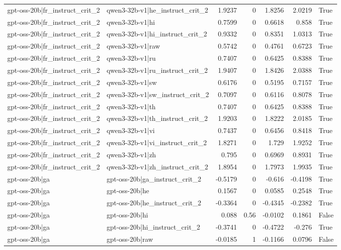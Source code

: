 \begin{table}
\begin{tabular}{l l r r r r l}
gpt-oss-20b|fr_instruct_crit_2 & qwen3-32b-v1|he_instruct_crit_2 & 1.9237 & 0 & 1.8256 & 2.0219 & True \\
gpt-oss-20b|fr_instruct_crit_2 & qwen3-32b-v1|hi & 0.7599 & 0 & 0.6618 & 0.858 & True \\
gpt-oss-20b|fr_instruct_crit_2 & qwen3-32b-v1|hi_instruct_crit_2 & 0.9332 & 0 & 0.8351 & 1.0313 & True \\
gpt-oss-20b|fr_instruct_crit_2 & qwen3-32b-v1|raw & 0.5742 & 0 & 0.4761 & 0.6723 & True \\
gpt-oss-20b|fr_instruct_crit_2 & qwen3-32b-v1|ru & 0.7407 & 0 & 0.6425 & 0.8388 & True \\
gpt-oss-20b|fr_instruct_crit_2 & qwen3-32b-v1|ru_instruct_crit_2 & 1.9407 & 0 & 1.8426 & 2.0388 & True \\
gpt-oss-20b|fr_instruct_crit_2 & qwen3-32b-v1|sw & 0.6176 & 0 & 0.5195 & 0.7157 & True \\
gpt-oss-20b|fr_instruct_crit_2 & qwen3-32b-v1|sw_instruct_crit_2 & 0.7097 & 0 & 0.6116 & 0.8078 & True \\
gpt-oss-20b|fr_instruct_crit_2 & qwen3-32b-v1|th & 0.7407 & 0 & 0.6425 & 0.8388 & True \\
gpt-oss-20b|fr_instruct_crit_2 & qwen3-32b-v1|th_instruct_crit_2 & 1.9203 & 0 & 1.8222 & 2.0185 & True \\
gpt-oss-20b|fr_instruct_crit_2 & qwen3-32b-v1|vi & 0.7437 & 0 & 0.6456 & 0.8418 & True \\
gpt-oss-20b|fr_instruct_crit_2 & qwen3-32b-v1|vi_instruct_crit_2 & 1.8271 & 0 & 1.729 & 1.9252 & True \\
gpt-oss-20b|fr_instruct_crit_2 & qwen3-32b-v1|zh & 0.795 & 0 & 0.6969 & 0.8931 & True \\
gpt-oss-20b|fr_instruct_crit_2 & qwen3-32b-v1|zh_instruct_crit_2 & 1.8954 & 0 & 1.7973 & 1.9935 & True \\
gpt-oss-20b|ga & gpt-oss-20b|ga_instruct_crit_2 & -0.5179 & 0 & -0.616 & -0.4198 & True \\
gpt-oss-20b|ga & gpt-oss-20b|he & 0.1567 & 0 & 0.0585 & 0.2548 & True \\
gpt-oss-20b|ga & gpt-oss-20b|he_instruct_crit_2 & -0.3364 & 0 & -0.4345 & -0.2382 & True \\
gpt-oss-20b|ga & gpt-oss-20b|hi & 0.088 & 0.56 & -0.0102 & 0.1861 & False \\
gpt-oss-20b|ga & gpt-oss-20b|hi_instruct_crit_2 & -0.3741 & 0 & -0.4722 & -0.276 & True \\
gpt-oss-20b|ga & gpt-oss-20b|raw & -0.0185 & 1 & -0.1166 & 0.0796 & False \\

\end{tabular}
\end{table}
